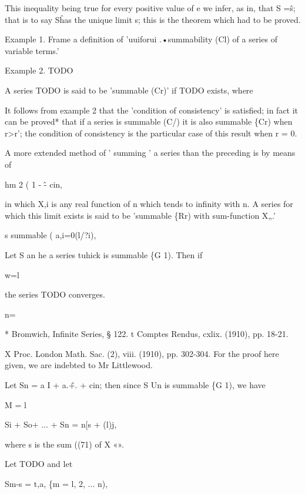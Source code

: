 This inequality being true for every positive value of e we infer, as
in, that S =\^s; that is to say S\^ has the unique limit s;
this is the theorem which had to be proved.

Example 1. Frame a definition of 'uuiforui .•summability (Cl) of a
series of variable terms.'

Example 2. TODO


A series TODO is said to be 'summable (Cr)' if TODO exists, where

It follows from example 2 that the 'condition of consistency'
is satisfied; in fact it can be proved* that if a series is summable
(C/) it is also summable \{Cr) when r>r'; the condition of consistency
is the particular case of this result when r = 0.


A more extended method of ' summing ' a series than the preceding is
by means of

hm 2 ( 1 - \^- cin,

in which X,i is any real function of n which tends to infinity with n.
A series for which this limit exists is said to be 'summable \{Rr)
with sum-function X„.'


s summable ( a,i=0(l/?i),

Let S an he a series tuhick is summable \{G 1). Then if

w=l

the series TODO converges.

n=\

* Bromwich, Infinite Series, § 122. t Comptes Rendus, cxlix. (1910),
pp. 18-21.

X Proc. London Math. Sac. (2), viii. (1910), pp. 302-304. For the
proof here given, we are indebted to Mr Littlewood.

Let Sn = a I + a.\^ +. + cin; then since S Un is summable \{G 1), we
have

% 
% 

M = l

Si + So+ ... + Sn = n[s + (l)j,

where s is the sum ((71) of X «».

Let TODO and let

Sm-s = t,a, \{m = l, 2, ... n),

